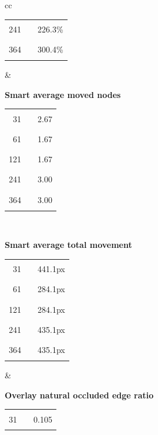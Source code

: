 \documentclass[11pt,a4paper,oneside,extrafontsizes]{memoir}
\begin{document}
\begin{center}
\begin{figure}[htbp]
\begin{tabular}{cc}
\begin{minipage}[t]{0.46\textwidth}
\begin{tabular}{@{}r l r@{}}
241 & \textcolor{blue!70!black}{\rule{0.1507\textwidth}{1.1ex}} & 226.3\% \\
364 & \textcolor{blue!70!black}{\rule{0.2000\textwidth}{1.1ex}} & 300.4\% \\
\end{tabular}
\end{minipage}
&
\begin{minipage}[t]{0.46\textwidth}
\centering
\textbf{Smart average moved nodes}\\[-0.2em]
\begin{tabular}{@{}r l r@{}}
31 & \textcolor{blue!70!black}{\rule{0.1780\textwidth}{1.1ex}} & 2.67 \\
61 & \textcolor{blue!70!black}{\rule{0.1113\textwidth}{1.1ex}} & 1.67 \\
121 & \textcolor{blue!70!black}{\rule{0.1113\textwidth}{1.1ex}} & 1.67 \\
241 & \textcolor{blue!70!black}{\rule{0.2000\textwidth}{1.1ex}} & 3.00 \\
364 & \textcolor{blue!70!black}{\rule{0.2000\textwidth}{1.1ex}} & 3.00 \\
\end{tabular}
\end{minipage} \\[1.2em]
\begin{minipage}[t]{0.46\textwidth}
\centering
\textbf{Smart average total movement}\\[-0.2em]
\begin{tabular}{@{}r l r@{}}
31 & \textcolor{blue!70!black}{\rule{0.2000\textwidth}{1.1ex}} & 441.1px \\
61 & \textcolor{blue!70!black}{\rule{0.1288\textwidth}{1.1ex}} & 284.1px \\
121 & \textcolor{blue!70!black}{\rule{0.1288\textwidth}{1.1ex}} & 284.1px \\
241 & \textcolor{blue!70!black}{\rule{0.1973\textwidth}{1.1ex}} & 435.1px \\
364 & \textcolor{blue!70!black}{\rule{0.1973\textwidth}{1.1ex}} & 435.1px \\
\end{tabular}
\end{minipage}
&
\begin{minipage}[t]{0.46\textwidth}
\centering
\textbf{Overlay natural occluded edge ratio}\\[-0.2em]
\begin{tabular}{@{}r l r@{}}
31 & \textcolor{blue!70!black}{\rule{0.0572\textwidth}{1.1ex}} & 0.105 \\

\end{tabular}
\end{minipage}
\end{tabular}
\end{figure}
\end{center}
\end{document}
